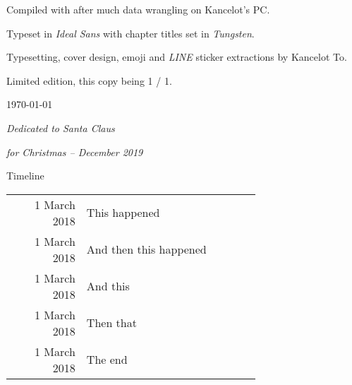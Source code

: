 %
%
\thispagestyle{empty}
\vspace*{13cm}
\begin{center}
    \small

    Compiled with \XeLaTeX{} after much data wrangling on Kancelot's PC.

    Typeset in \emph{Ideal Sans} with chapter titles set in \emph{Tungsten}.

    \vspace{1.2ex}

    Typesetting, cover design, emoji and \emph{LINE} sticker extractions by Kancelot To.

    \vspace{2ex}
    \vspace{3ex}

    Limited edition, this copy being 1 / 1.

    \vspace{1.2ex}

    \today
\end{center}
\clearpage


%
%
\thispagestyle{empty}
\vspace*{2cm}
\begin{center}
	{\Large\itshape Dedicated to Santa Claus}
	
	\vspace{4ex}
	
	{\itshape for Christmas -- December 2019}
\end{center}
\clearpage


%
%
\begingroup
\pagestyle{empty}
\cleardoublepage
\endgroup


%
%
\thispagestyle{empty}
\vspace*{2cm}
{\Huge Timeline} \\

\vspace{3cm}

\begin{longtable}{Rp{0.7\linewidth}}

 1 March 2018 & This happened \\[1ex]

 1 March 2018 & And then this happened \\[1ex]

 1 March 2018 & And this \\[1ex]

 1 March 2018 & Then that \\[1ex]

 1 March 2018 & The end \\[1ex]

\end{longtable}

\clearpage

%
%
\begingroup
\pagestyle{empty}
\cleardoublepage
\endgroup
